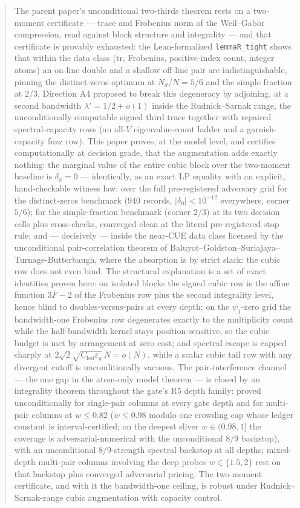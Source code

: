 \documentclass[11pt]{article}
\theoremstyle{plain}
\theoremstyle{definition}
\theoremstyle{remark}
\newcommand{\Cled}{C_{\mathrm{led}}}
\newcommand{\Nd}{N_{d}}
\begin{document}
\begin{abstract}
The parent paper's unconditional two-thirds theorem rests on a two-moment
certificate --- trace and Frobenius norm of the Weil--Gabor compression, read
against block structure and integrality --- and that certificate is provably
exhausted: the Lean-formalized \texttt{lemmaR\_tight} shows that within the data
class (tr, Frobenius, positive-index count, integer atoms) an on-line double and
a shallow off-line pair are indistinguishable, pinning the distinct-zeros
optimum at $\Nd/N = 5/6$ and the simple fraction at $2/3$. Direction A4 proposed
to break this degeneracy by adjoining, at a second bandwidth
$\lambda' = 1/2 + o(1)$ inside the Rudnick--Sarnak range, the unconditionally
computable signed third trace together with repaired spectral-capacity rows (an
all-$V$ eigenvalue-count ladder and a garnish-capacity fuzz row). This paper
proves, at the model level, and certifies computationally at decision grade,
that the augmentation adds exactly nothing: the marginal value of the entire
cubic block over the two-moment baseline is $\delta_0 = 0$ --- identically, as
an exact LP equality with an explicit, hand-checkable witness law: over the full
pre-registered adversary grid for the distinct-zeros benchmark ($940$ records,
$|\delta_0| < 10^{-12}$ everywhere, corner $5/6$); for the simple-fraction
benchmark (corner $2/3$) at its two decision cells plus cross-checks, converged
clean at the literal pre-registered stop rule; and --- decisively --- inside the
near-CUE data class licensed by the unconditional pair-correlation theorem of
Baluyot--Goldston--Suriajaya--Turnage-Butterbaugh, where the absorption is by
strict slack: the cubic row does not even bind. The structural explanation is a
set of exact identities proven here: on isolated blocks the signed cubic row is
the affine function $3F - 2$ of the Frobenius row plus the second integrality
level, hence blind to doubles-versus-pairs at every depth; on the $\psi_1$-zero
grid the bandwidth-one Frobenius row degenerates exactly to the multiplicity
count while the half-bandwidth kernel stays position-sensitive, so the cubic
budget is met by arrangement at zero cost; and spectral escape is capped sharply
at $2\sqrt{2}\sqrt{\Cled \varepsilon_g}\,N = o(N)$, while a scalar cubic tail row
with any divergent cutoff is unconditionally vacuous. The pair-interference
channel --- the one gap in the atom-only model theorem --- is closed by an
integrality theorem throughout the gate's R5 depth family: proved
unconditionally for single-pair columns at every gate depth and for multi-pair
columns at $w \le 0.82$ ($w \le 0.98$ modulo one crowding cap whose ledger
constant is interval-certified; on the deepest sliver $w \in (0.98, 1]$ the
coverage is adversarial-numerical with the unconditional $8/9$ backstop), with
an unconditional $8/9$-strength spectral backstop at all depths; mixed-depth
multi-pair columns involving the deep probes $w \in \{1.5, 2\}$ rest on that
backstop plus converged adversarial pricing. The two-moment certificate, and
with it the bandwidth-one ceiling, is robust under Rudnick--Sarnak-range cubic
augmentation with capacity control.
\end{abstract}
\end{document}
